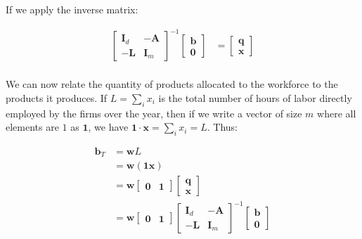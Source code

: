 If we apply the inverse matrix:

\begin{align}
\left[\begin{array}{cc}
\boldsymbol{I}_{d} & -\boldsymbol{A}\\
-\boldsymbol{L} & \boldsymbol{I}_{m}
\end{array}\right]^{-1} \left[\begin{array}{c}
\boldsymbol{b}\\
\boldsymbol{0}
\end{array}\right] & =\left[\begin{array}{c}
\boldsymbol{q}\\
\boldsymbol{x}
\end{array}\right]\\
\end{align}

We can now relate the quantity of products allocated to the workforce to the products it produces. If $L=\sum_{i}x_{i}$ is the total number of hours of labor directly employed by the firms over the year, then if we write a vector of size $m$ where all elements are $1$ as $\boldsymbol{1}$, we have $\boldsymbol{1}\cdot\boldsymbol{x}=\sum_{i}x_{i}=L$. Thus:


\begin{align}
\boldsymbol{b}_{T} & =\boldsymbol{w}L\\
 & =\boldsymbol{w}\left(\boldsymbol{1}\boldsymbol{x}\right)\\
 & =\boldsymbol{w}\left[\begin{array}{cc}
\boldsymbol{0} & \boldsymbol{1}\end{array}\right]\left[\begin{array}{c}
\boldsymbol{q}\\
\boldsymbol{x}\end{array}\right]\\
 & =\boldsymbol{w}\left[\begin{array}{cc}
\boldsymbol{0} & \boldsymbol{1}\end{array}\right]\left[\begin{array}{cc}
\boldsymbol{I}_{d} & -\boldsymbol{A}\\
-\boldsymbol{L} & \boldsymbol{I}_{m}
\end{array}\right]^{-1}\left[\begin{array}{c}
\boldsymbol{b}\\
\boldsymbol{0}
\end{array}\right]
\end{align}

